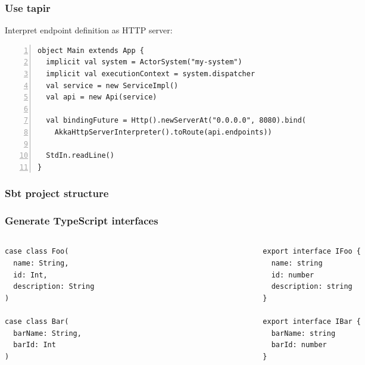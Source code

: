 \documentclass[aspectratio=169]{beamer}
\begin{document}
\begin{frame}[fragile]

\frametitle{Use tapir}
Interpret endpoint definition as HTTP server:

\begin{lstlisting}[style=myScalaStyle,frame=none,numbers=left]
object Main extends App {
  implicit val system = ActorSystem("my-system")
  implicit val executionContext = system.dispatcher
  val service = new ServiceImpl()
  val api = new Api(service)

  val bindingFuture = Http().newServerAt("0.0.0.0", 8080).bind(
    AkkaHttpServerInterpreter().toRoute(api.endpoints))

  StdIn.readLine()
}
\end{lstlisting}
\end{frame}

\begin{frame}[fragile]
\frametitle{Sbt project structure}


\end{frame}

\begin{frame}[fragile]
\frametitle{Generate TypeScript interfaces}

\begin{columns}
\begin{column}{0.4\textwidth}
\begin{lstlisting}[style=myScalaStyle,frame=none]
case class Foo(
  name: String,
  id: Int,
  description: String
)

case class Bar(
  barName: String, 
  barId: Int
)
\end{lstlisting}
\end{column}
\begin{column}{0.4\textwidth}
\begin{lstlisting}[style=myScalaStyle,frame=none]
export interface IFoo {
  name: string
  id: number
  description: string
}

export interface IBar {
  barName: string
  barId: number
}
\end{lstlisting}
\end{column}
\end{columns}
\end{frame}
\end{document}
